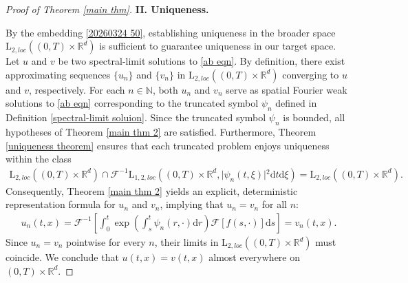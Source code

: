\documentclass[11pt,reqno]{amsart}
\theoremstyle{definition}
\theoremstyle{remark}
\newcommand\bN{\mathbb{N}}
\newcommand\bR{\mathbb{R}}
\newcommand\cF{\mathcal{F}}
\numberwithin{equation}{section}
\begin{document}
\begin{proof}[Proof of Theorem \ref{main thm}]
\vspace{2mm}
{\bf II. Uniqueness.}
\vspace{2mm}



By the embedding \eqref{20260324 50}, establishing uniqueness in the broader space $\mathrm{L}_{2,loc}\left( (0,T) \times \bR^d\right)$ is sufficient to guarantee uniqueness in our target space.
Let $u$ and $v$ be two spectral-limit solutions to \eqref{ab eqn}. By definition, there exist approximating sequences $\{u_n\}$ and $\{v_n\}$ in $\mathrm{L}_{2,loc}\left( (0,T) \times \bR^d \right)$ converging to $u$ and $v$, respectively. 
For each $n \in \bN$, both $u_n$ and $v_n$ serve as spatial Fourier weak solutions to \eqref{ab eqn} corresponding to the truncated symbol $\psi_n$ defined in Definition \ref{spectral-limit soluion}.
Since the truncated symbol $\psi_n$ is bounded, all hypotheses of Theorem \ref{main thm 2} are satisfied. 
Furthermore, Theorem \ref{uniqueness theorem} ensures that each truncated problem enjoys uniqueness within the class
\begin{align*}
\mathrm{L}_{2,loc}\left( (0,T) \times \bR^d \right) \cap \cF^{-1}\mathrm{L}_{1,2,loc}\left( (0,T) \times \bR^d, \vert{}\psi_n(t,\xi)\vert{}^2 \mathrm{d}t \mathrm{d}\xi \right) = \mathrm{L}_{2,loc}\left( (0,T) \times \bR^d \right).
\end{align*}
Consequently, Theorem \ref{main thm 2} yields an explicit, deterministic representation formula for $u_n$ and $v_n$, implying that $u_n = v_n$ for all $n$:
\begin{align*}
u_n(t,x) = \cF^{-1}\left[ \int_0^t \exp\left(\int_s^t \psi_n(r,\cdot)\mathrm{d}r \right) \cF[f(s,\cdot)]\mathrm{d}s \right] 
= v_n(t,x).
\end{align*}
Since $u_n = v_n$ pointwise for every $n$, their limits in $\mathrm{L}_{2,loc}\left( (0,T) \times \bR^d \right)$ must coincide. We conclude that $u(t,x) = v(t,x)$ almost everywhere on $(0,T) \times \bR^d$.

\end{proof}
\end{document}
